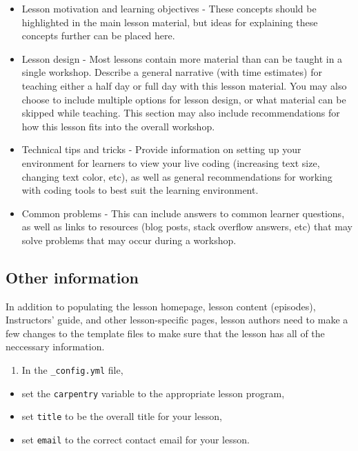 \documentclass[
]{book}
\providecommand{\tightlist}{%
  \setlength{\itemsep}{0pt}\setlength{\parskip}{0pt}}
\begin{document}
\begin{itemize}
\item
  Lesson motivation and learning objectives - These concepts should be highlighted in the main lesson material,
  but ideas for
  explaining these concepts further can be placed here.
\item
  Lesson design - Most lessons contain more material than can be taught in a single workshop.
  Describe a general narrative (with time estimates) for teaching either a half day
  or full day with this lesson material. You may also choose to include multiple
  options for lesson design, or what material can be skipped while teaching.
  This section may also include recommendations for how this lesson fits into
  the overall workshop.
\item
  Technical tips and tricks - Provide information on setting up your environment for learners to view your
  live coding (increasing text size, changing text color, etc), as well as
  general recommendations for working with coding tools to best suit the
  learning environment.
\item
  Common problems - This can include answers to common learner questions, as well as links to
  resources (blog posts, stack overflow answers, etc) that may solve problems that
  may occur during a workshop.
\end{itemize}

\hypertarget{other-information}{%
\subsection{Other information}\label{other-information}}

In addition to populating the lesson homepage, lesson content (episodes),
Instructors' guide, and other lesson-specific
pages, lesson authors need to make a few changes to the template
files to make sure that the lesson has all of the neccessary
information.

\begin{enumerate}
\def\labelenumi{\arabic{enumi}.}
\tightlist
\item
  In the \texttt{\_config.yml} file,
\end{enumerate}

\begin{itemize}
\tightlist
\item
  set the \texttt{carpentry} variable to the appropriate lesson program,
\item
  set \texttt{title} to be the overall title for your lesson,
\item
  set \texttt{email} to the correct contact email for your lesson.
\end{itemize}
\end{document}
